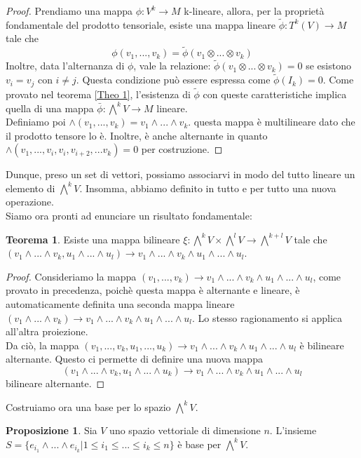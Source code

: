 \documentclass[12pt,a4paper]{report}
\theoremstyle{definition}
\theoremstyle{Theorem}
\newtheorem{Theo}[Def]{Teorema}
\newtheorem{Prop}[Def]{Proposizione}
\theoremstyle{definition}
\theoremstyle{definition}
\theoremstyle{definition}
\begin{document}
\begin{proof}
	Prendiamo una mappa $\phi:V^k\rightarrow M$ k-lineare, allora, per la proprietà fondamentale del prodotto tensoriale, esiste una mappa lineare $\tilde{\phi}:T^k(V)\rightarrow M$ tale che $$\phi(v_1,...,v_k)=\tilde{\phi}(v_1\otimes...\otimes v_k)$$ 
	Inoltre, data l'alternanza di $\phi$, vale la relazione: $\tilde{\phi}(v_1\otimes...\otimes v_k)=0$ se esistono $v_i=v_j$ con $i\neq j$. Questa condizione può essere espressa come $\tilde{\phi}(I_k)=0$.
	Come provato nel teorema \ref{Theo 1}, l'esistenza di $\tilde{\phi}$ con queste caratteristiche implica quella di una mappa $\bar{\phi}:\bigwedge^kV\rightarrow M$ lineare.\\
	Definiamo poi $\wedge(v_1,...,v_k)=v_1\wedge...\wedge v_k$. questa mappa è multilineare dato che il prodotto tensore lo è. Inoltre, è anche alternante in quanto $\wedge(v_1,...,v_i,v_i,v_{i+2},...v_k)=0$ per costruzione.
\end{proof}
Dunque, preso un set di vettori, possiamo associarvi in modo del tutto lineare un elemento di $\bigwedge^kV$. Insomma, abbiamo definito in tutto e per tutto una nuova operazione.\\
Siamo ora pronti ad enunciare un risultato fondamentale:
\begin{Theo}
	Esiste una mappa bilineare $\xi:\bigwedge^kV\times\bigwedge^lV\rightarrow\bigwedge^{k+l}V$ tale che $(v_1\wedge...\wedge v_k,u_1\wedge...\wedge u_l)\longrightarrow v_1\wedge...\wedge v_k\wedge u_1\wedge...\wedge u_l $.
\end{Theo}
\begin{proof}
	Consideriamo la mappa $(v_1,..., v_k)\longrightarrow v_1\wedge...\wedge v_k\wedge u_1\wedge...\wedge u_l$, come provato in precedenza, poichè questa mappa è alternante e lineare, è automaticamente definita una seconda mappa lineare $(v_1\wedge...\wedge v_k)\longrightarrow v_1\wedge...\wedge v_k\wedge u_1\wedge...\wedge u_l$. Lo stesso ragionamento si applica all'altra proiezione.\\
	Da ciò, la mappa $(v_1,..., v_k,u_1,...,u_k)\longrightarrow v_1\wedge...\wedge v_k\wedge u_1\wedge...\wedge u_l$ è bilineare alternante. Questo ci permette di definire una nuova mappa
	$$(v_1\wedge...\wedge v_k,u_1\wedge...\wedge u_k)\longrightarrow v_1\wedge...\wedge v_k\wedge u_1\wedge...\wedge u_l$$ bilineare alternante.
\end{proof}
Costruiamo ora una base per lo spazio $\bigwedge^kV$.
\begin{Prop}
	Sia $V$ uno spazio vettoriale di dimensione $n$. L'insieme $S=\{e_{i_1}\wedge...\wedge e_{i_k}|1\leq i_1\le...\le i_k\leq n \}$ è base per $\bigwedge^kV$.
\end{Prop}
\end{document}
